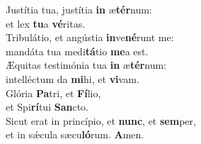\evenverse Justítia tua, justítia \textbf{in} æ\textbf{tér}num:~\*\\
\evenverse et lex \textbf{tu}a \textbf{vé}ritas.\\
\oddverse Tribulátio, et angústia \textbf{in}ve\textbf{né}runt me:~\*\\
\oddverse mandáta tua medi\textbf{tá}tio \textbf{me}a est.\\
\evenverse Æquitas testimónia tua \textbf{in} æ\textbf{tér}num:~\*\\
\evenverse intelléctum da \textbf{mi}hi, et \textbf{vi}vam.\\
\oddverse Glória \textbf{Pa}tri, et \textbf{Fí}lio,~\*\\
\oddverse et Spi\textbf{rí}tui \textbf{San}cto.\\
\evenverse Sicut erat in princípio, et \textbf{nunc}, et \textbf{sem}per,~\*\\
\evenverse et in sǽcula sæcu\textbf{ló}rum. \textbf{A}men.\\
